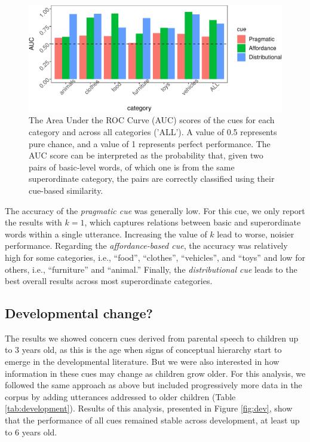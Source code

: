 \documentclass[english,,man,floatsintext]{apa6}
\begin{document}
\begin{figure}[h]

{\centering \includegraphics{cogsci_journal_files/figure-latex/data-all-1} 

}

\caption{\label{fig:data-all} The Area Under the ROC Curve (AUC) scores of the cues for each category and across all categories ('ALL'). A value of 0.5 represents pure chance, and a value of 1 represents perfect performance. The AUC score can be interpreted as the probability that, given two pairs of basic-level words, of which one is from the same superordinate category, the pairs are correctly classified using their  cue-based similarity.}\label{fig:data-all}
\end{figure}

The accuracy of the \emph{pragmatic cue} was generally low. For this cue, we only report the results with \(k=1\), which captures relations between basic and superordinate words within a single utterance. Increasing the value of \(k\) lead to worse, noisier performance. Regarding the \emph{affordance-based cue}, the accuracy was relatively high for some categories, i.e., \enquote{food}, \enquote{clothes}, \enquote{vehicles}, and \enquote{toys} and low for others, i.e., \enquote{furniture} and \enquote{animal.} Finally, the \emph{distributional cue} leads to the best overall results across most superordinate categories.

\hypertarget{developmental-change}{%
\subsection{Developmental change?}\label{developmental-change}}

The results we showed concern cues derived from parental speech to children up to 3
years old, as this is the age when signs of conceptual hierarchy start
to emerge in the developmental literature. But we were also interested
in how information in these cues may change as children grow older.
For this analysis, we followed the same approach as above but included progressively more data in the corpus by adding utterances addressed to older children (Table \ref{tab:development}). Results of this analysis, presented in Figure \ref{fig:dev}, show that the performance of all cues remained stable across development, at least up to 6 years old.
\end{document}
